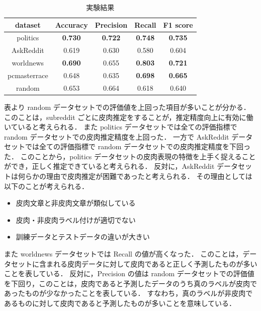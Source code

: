 \begin{table}[tb]
  \caption{実験結果}
  \label{tb:4_bert_result}
  \centering
  \begin{tabular}{c c c c c} \hline

dataset & Accuracy & Precision & Recall & F1 score  \\ \hline
politics & \textbf{0.730} & \textbf{0.722} & \textbf{0.748} & \textbf{0.735} \\
AskReddit & 0.619 & 0.630 & 0.580 & 0.604 \\
worldnews & \textbf{0.690} & 0.655 & \textbf{0.803} & \textbf{0.721} \\
pcmasterrace & 0.648 & 0.635 & \textbf{0.698}  & \textbf{0.665} \\ \hline
random & 0.653 & 0.664 & 0.618 & 0.640 \\ \hline

  \end{tabular}
\end{table}


表より random データセットでの評価値を上回った項目が多いことが分かる．
このことは，subreddit ごとに皮肉推定をすることが，推定精度向上に有効に働いていると考えられる．
また politics データセットでは全ての評価指標で random データセットでの皮肉推定精度を上回った．
一方で AskReddit データセットでは全ての評価指標で random データセットでの皮肉推定精度を下回った．
このことから，politics データセットの皮肉表現の特徴を上手く捉えることができ，正しく推定できていると考えられる．
反対に，AskReddit データセットは何らかの理由で皮肉推定が困難であったと考えられる．
その理由としては以下のことが考えられる．
\begin{itemize}
	\setlength{\itemsep}{-1mm}
\item 皮肉文章と非皮肉文章が類似している
\item 皮肉・非皮肉ラベル付けが適切でない
\item 訓練データとテストデータの違いが大きい
\end{itemize}

また worldnews データセットでは Recall の値が高くなった．
このことは，データセットに含まれる皮肉データに対して皮肉であると正しく予測したものが多いことを表している．
反対に，Precision の値は random データセットでの評価値を下回り，このことは，皮肉であると予測したデータのうち真のラベルが皮肉であったものが少なかったことを表している．
すなわち，真のラベルが非皮肉であるものに対して皮肉であると予測したものが多いことを意味している．


\afterpage{\clearpage}
